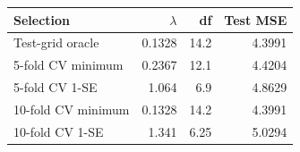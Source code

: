 \begin{center}
\small
\setlength{\tabcolsep}{4pt}
\begin{tabular}{lrrr}
\toprule
Selection & $\lambda$ & df & Test MSE \\
\midrule
Test-grid oracle & 0.1328 & 14.2 & 4.3991 \\
5-fold CV minimum & 0.2367 & 12.1 & 4.4204 \\
5-fold CV 1-SE & 1.064 &  6.9 & 4.8629 \\
10-fold CV minimum & 0.1328 & 14.2 & 4.3991 \\
10-fold CV 1-SE & 1.341 & 6.25 & 5.0294 \\
\bottomrule
\end{tabular}
\end{center}
